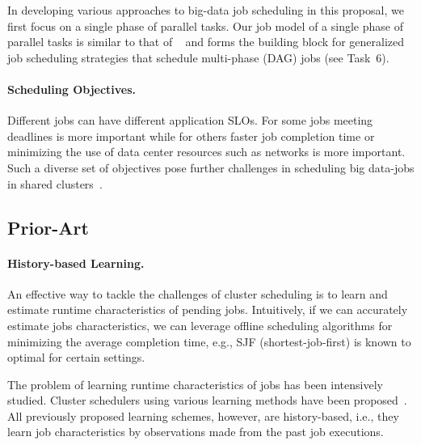In developing various approaches to big-data job scheduling in this
proposal, we first focus on a single phase of parallel tasks. Our
job model of a single phase of parallel tasks is similar to that of
~\cite{borg,perforator:socc2016,IfYouAreLateDontBlameUs:socc14} and
forms the building block for generalized job scheduling strategies
that schedule multi-phase (DAG) jobs (see  Task~6).
 
\paragraph*{Scheduling Objectives.}
Different jobs can have different application SLOs. For some jobs meeting
deadlines is more important while for others faster job completion
time or minimizing the use of data center resources such as networks
is more important. Such a diverse set of objectives pose further
challenges in scheduling big data-jobs in shared
clusters~\cite{drf:nsdi11,jockey:eurosys2012, shufflewatcher, corral,
  morpheus, delay:eurosys10, cdef:atc18}.
 
\subsection{Prior-Art}
\label{subsec:prior}
 
\paragraph*{History-based Learning.}
An effective way to tackle the challenges of cluster scheduling is to
learn and estimate runtime characteristics of pending
jobs. Intuitively, if we can accurately estimate jobs characteristics,
we can leverage offline 
scheduling algorithms for minimizing the average completion time, e.g.,
SJF (shortest-job-first) is known to optimal for certain settings.
 
The problem of learning runtime characteristics of jobs has been
intensively studied. Cluster schedulers using various learning methods
have been proposed~\cite{corral, morpheus, shufflewatcher, 3Sigma,
  tetrisched, DontCryOverSpilledRecords, perforator:socc2016,
  Apollo:osdi2014, wsmith:IEEE98, stratus:socc2018,
  roughSetEstimation:IEEE:Shonali}.  All previously proposed learning
schemes, however, are history-based, i.e., they learn job characteristics by
observations made from the past job executions. 

